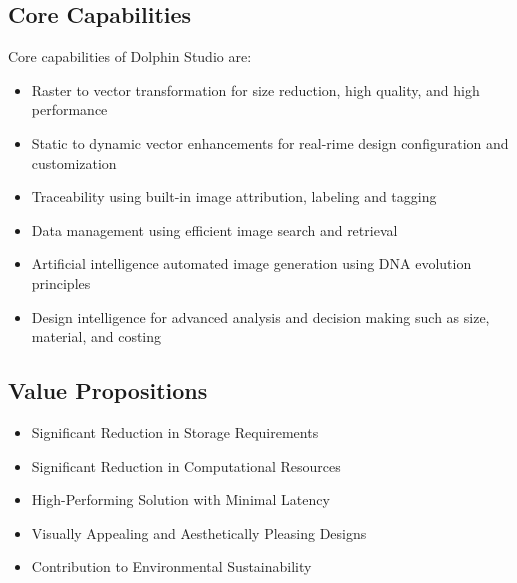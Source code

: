\documentclass{amm-pst-report}
\begin{document}
\subsection{Core Capabilities}
Core capabilities of Dolphin Studio are:
\begin{itemize}[nosep]
\item Raster to vector transformation for size reduction, high quality, and high performance
\item Static to dynamic vector enhancements for real-rime design configuration and customization
\item Traceability using built-in image attribution, labeling and tagging
\item Data management using efficient image search and retrieval
\item Artificial intelligence automated image generation using DNA evolution principles
\item Design intelligence for advanced analysis and decision making such as size, material, and costing
\end{itemize}

\subsection{Value Propositions}
\begin{itemize}
\item Significant Reduction in Storage Requirements
\item Significant Reduction in Computational Resources
\item High-Performing Solution with Minimal Latency
\item Visually Appealing and Aesthetically Pleasing Designs
\item Contribution to Environmental Sustainability
\end{itemize}
\end{document}

